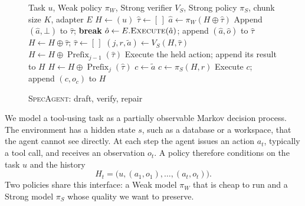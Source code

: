 \documentclass[11pt, copyright, logo, secondlogo]{template/lark}
\newcommand{\SpecAgent}{\textsc{SpecAgent}\xspace}
\begin{document}
%
\begin{figure}
\vspace{-1.2em}
\begin{minipage}{\linewidth}
\begin{algorithm}[H]
\caption{\SpecAgent{}: draft, verify, repair}
\label{alg:specagent}
\footnotesize
\begin{algorithmic}[1]
\Require Task $u$, Weak policy $\pi_W$, Strong verifier $V_S$, Strong policy
$\pi_S$, chunk size $K$, adapter $E$
\State $H\gets(u)$
  \State $\hat\tau\gets[\,]$
  \Loop
    \State $\hat a\gets\pi_W(H\oplus\hat\tau)$
      \State Append $(\hat a,\bot)$ to $\hat\tau$; \textbf{break}
    \EndIf
    \State $\hat o\gets E.\textsc{Execute}(\hat a)$; append $(\hat a,\hat o)$ to
      $\hat\tau$
      \State $H\gets H\oplus\hat\tau$; $\hat\tau\gets[\,]$
    \EndIf
  \EndLoop
  \State $(j,r,\tilde a)\gets V_S(H,\hat\tau)$
    \State $H\gets H\oplus\operatorname{Prefix}_{j-1}(\hat\tau)$
    \State Execute the held action; append its result to $H$
  \Else
    \State $H\gets H\oplus\operatorname{Prefix}_j(\hat\tau)$
      \State $c\gets\tilde a$
    \Else
      \State $c\gets\pi_S(H,r)$
    \EndIf
    \State Execute $c$; append $(c,o_c)$ to $H$
  \EndIf
\EndWhile
\end{algorithmic}
\end{algorithm}
\end{minipage}
\vspace{-1.0em}
\end{figure}
 We model a tool-using task as a partially observable Markov decision process.
The environment has a hidden state $s$, such as a database or a workspace,
that the agent cannot see directly. At each step the agent issues an action
$a_t$, typically a tool call, and receives an observation $o_t$. A policy
therefore conditions on the task $u$ and the history
\begin{equation}
H_t=\bigl(u,(a_1,o_1),\ldots,(a_t,o_t)\bigr).
\label{eq:confirmed_history}
\end{equation}
Two policies share this interface: a Weak model $\pi_W$ that is cheap to run
and a Strong model $\pi_S$ whose quality we want to preserve.
\end{document}
